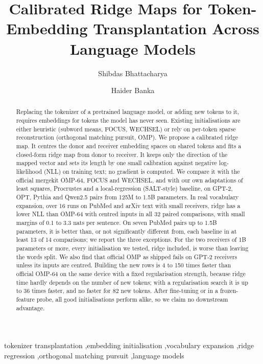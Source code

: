 \documentclass[preprint,12pt]{elsarticle}
\begin{document}
\begin{frontmatter}
\title{Calibrated Ridge Maps for Token-Embedding Transplantation Across Language Models}

\author[a]{Shibdas Bhattacharya}
\author[a]{Haider Banka}

\begin{abstract}
Replacing the tokenizer of a pretrained language model, or adding new tokens to it, requires embeddings for tokens the model has never seen. Existing initialisations are either heuristic (subword means, FOCUS, WECHSEL) or rely on per-token sparse reconstruction (orthogonal matching pursuit, OMP). We propose a calibrated ridge map. It centres the donor and receiver embedding spaces on shared tokens and fits a closed-form ridge map from donor to receiver. It keeps only the direction of the mapped vector and sets its length by one small calibration against negative log-likelihood (NLL) on training text; no gradient is computed. We compare it with the official mergekit OMP-64, FOCUS and WECHSEL, and with our own adaptations of least squares, Procrustes and a local-regression (SALT-style) baseline, on GPT-2, OPT, Pythia and Qwen2.5 pairs from 125M to 1.5B parameters. In real vocabulary expansion, over 16 runs on PubMed and arXiv text with small receivers, ridge has a lower NLL than OMP-64 with centred inputs in all 32 paired comparisons, with small margins of 0.1 to 3.3 nats per sentence. On seven PubMed pairs up to 1.5B parameters, it is better than, or not significantly different from, each baseline in at least 13 of 14 comparisons; we report the three exceptions. For the two receivers of 1B parameters or more, every initialisation we tested, ridge included, is worse than leaving the words split. We also find that official OMP as shipped fails on GPT-2 receivers unless its inputs are centred. Building the new rows is 4 to 150 times faster than official OMP-64 on the same device with a fixed regularisation strength, because ridge time hardly depends on the number of new tokens; with a regularisation search it is up to 36 times faster, and no faster for 82 new tokens. After fine-tuning or in a frozen-feature probe, all good initialisations perform alike, so we claim no downstream advantage.
\end{abstract}

\begin{keyword}
tokenizer transplantation \sep embedding initialisation \sep vocabulary expansion \sep ridge regression \sep orthogonal matching pursuit \sep language models
\end{keyword}
\end{frontmatter}
\end{document}
